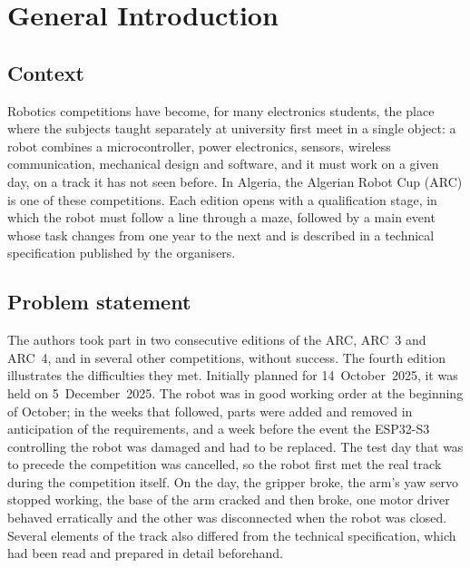 \chapter*{General Introduction}

\section*{Context}
Robotics competitions have become, for many electronics students, the place where
the subjects taught separately at university first meet in a single object: a robot
combines a microcontroller, power electronics, sensors, wireless communication, mechanical
design and software, and it must work on a given day, on a track it has not seen before. In
Algeria, the Algerian Robot Cup (ARC) is one of these competitions. Each edition opens with
a qualification stage, in which the robot must follow a line through a maze, followed by a
main event whose task changes from one year to the next and is described in a technical
specification published by the organisers.

\section*{Problem statement}
The authors took part in two consecutive editions of the ARC, ARC~3 and ARC~4, and in
several other competitions, without success. The fourth edition illustrates the
difficulties they met. Initially planned for 14~October~2025, it was held on 5~December~2025.
The robot was in good working order at the beginning of October; in the weeks that
followed, parts were added and removed in anticipation of the requirements, and a week
before the event the ESP32-S3 controlling the robot was damaged and had to be replaced.
The test day that was to precede the competition was cancelled, so the robot first met the
real track during the competition itself. On the day, the gripper broke, the arm's yaw servo
stopped working, the base of the arm cracked and then broke, one motor driver
behaved erratically and the other was disconnected when the robot was closed. Several
elements of the track also differed from the technical specification, which had been read
and prepared in detail beforehand.

